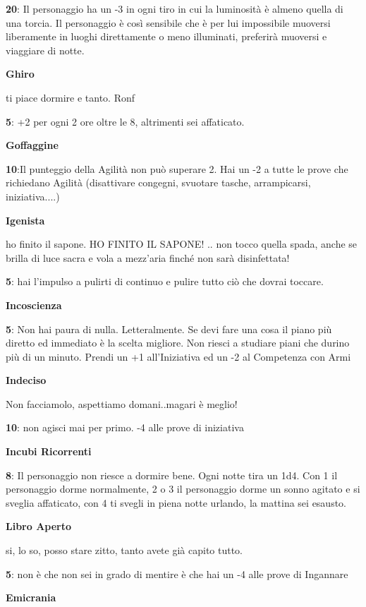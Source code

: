 \documentclass[a4paper,11pt,twoside,openany]{book}
\begin{document}
{\textbf{20}: Il personaggio ha un -3 in ogni tiro in cui la luminosità è almeno quella di una torcia. Il personaggio è così sensibile che è per lui impossibile muoversi liberamente in luoghi direttamente o meno illuminati, preferirà muoversi e viaggiare di notte.

\textbf{Ghiro}

ti piace dormire e tanto. Ronf

\textbf{5}: +2 per ogni 2 ore oltre le 8, altrimenti sei affaticato.

\textbf{Goffaggine}

\textbf{10}:Il punteggio della Agilità non può superare 2. Hai un -2 a tutte le prove che richiedano Agilità (disattivare congegni, svuotare tasche, arrampicarsi, iniziativa....) 

\textbf{Igenista}

ho finito il sapone. HO FINITO IL SAPONE! .. non tocco quella spada, anche se brilla di luce sacra e vola a mezz'aria finché non sarà disinfettata!

\textbf{5}: hai l'impulso a pulirti di continuo e pulire tutto ciò che dovrai toccare.

\textbf{Incoscienza}

\textbf{5}: Non hai paura di nulla. Letteralmente. Se devi fare una cosa il piano più diretto ed immediato è la scelta migliore. Non riesci a studiare piani che durino più di un minuto. Prendi un +1 all'Iniziativa ed un -2 al Competenza con Armi

\textbf{Indeciso}

Non facciamolo, aspettiamo domani..magari è meglio!

\textbf{10}: non agisci mai per primo. -4 alle prove di iniziativa

\textbf{Incubi Ricorrenti}

\textbf{8}: Il personaggio non riesce a dormire bene. Ogni notte tira un 1d4. Con 1 il personaggio dorme normalmente, 2 o 3 il personaggio dorme un sonno agitato e si sveglia affaticato, con 4 ti svegli in piena notte urlando, la mattina sei esausto.

\textbf{Libro Aperto}

si, lo so, posso stare zitto, tanto avete già capito tutto.

\textbf{5}: non è che non sei in grado di mentire è che hai un -4 alle prove di Ingannare

\textbf{Emicrania}

}
\end{document}
